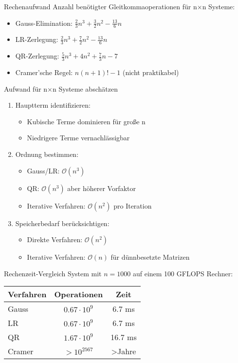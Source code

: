 \begin{concept}{Rechenaufwand}
Anzahl benötigter Gleitkommaoperationen für n×n Systeme:
\begin{itemize}
    \item Gauss-Elimination: $\frac{2}{3}n^3 + \frac{3}{2}n^2 - \frac{13}{6}n$
    \item LR-Zerlegung: $\frac{2}{3}n^3 + \frac{7}{2}n^2 - \frac{13}{6}n$
    \item QR-Zerlegung: $\frac{5}{3}n^3 + 4n^2 + \frac{7}{3}n - 7$
    \item Cramer'sche Regel: $n(n+1)! - 1$ (nicht praktikabel)
\end{itemize}
\end{concept}

\begin{KR}{Aufwand für n×n Systeme abschätzen}
\begin{enumerate}
    \item Hauptterm identifizieren:
    \begin{itemize}
        \item Kubische Terme dominieren für große n
        \item Niedrigere Terme vernachlässigbar
    \end{itemize}
    
    \item Ordnung bestimmen:
    \begin{itemize}
        \item Gauss/LR: $\mathcal{O}(n^3)$
        \item QR: $\mathcal{O}(n^3)$ aber höherer Vorfaktor
        \item Iterative Verfahren: $\mathcal{O}(n^2)$ pro Iteration
    \end{itemize}
    
    \item Speicherbedarf berücksichtigen:
    \begin{itemize}
        \item Direkte Verfahren: $\mathcal{O}(n^2)$
        \item Iterative Verfahren: $\mathcal{O}(n)$ für dünnbesetzte Matrizen
    \end{itemize}
\end{enumerate}
\end{KR}

\begin{example2}{Rechenzeit-Vergleich}
System mit $n=1000$ auf einem 100 GFLOPS Rechner:
\begin{center}
\begin{tabular}{l|cc}
Verfahren & Operationen & Zeit \\
\hline
Gauss & $0.67\cdot10^9$ & 6.7 ms \\
LR & $0.67\cdot10^9$ & 6.7 ms \\
QR & $1.67\cdot10^9$ & 16.7 ms \\
Cramer & $>10^{2567}$ & >Jahre
\end{tabular}
\end{center}
\end{example2}

